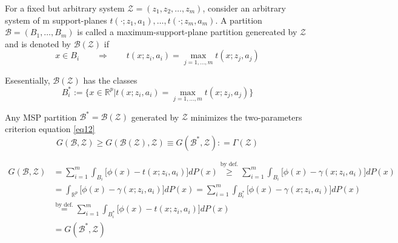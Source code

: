\documentclass{article}
\begin{document}
\begin{tcolorbox}[coltitle= black!80, colframe=green!35, colback=green!10 ,title=\textbf{Definition: Maximum Support Plane (MSP)}]
For a fixed but arbitrary system $\mathcal Z = (z_1, z_2, \ldots,z_m)$, consider an arbitrary system of m support-planes $t(\cdot; z_1,a_1),\ldots, t(\cdot; z_m,a_m)$. A partition $\mathcal B = (B_1, \ldots, B_m)$ is called a maximum-support-plane partition genereated by $\mathcal Z$ and is denoted by $\mathcal B(\mathcal Z)$ if
\vspace{-4mm}
\begin{equation}
	x \in B_i \quad\quad  \Rightarrow  \quad\quad t(x;z_i,a_i) = \max_{j = 1,\ldots,m} t(x; z_j,a_j)
\end{equation}

Esesentially, $\mathcal B(\mathcal Z)$ has the classes
\vspace{-2mm}
\begin{equation}
	B_i^* := \big\{ x\in \mathbb R^p \big| t(x; z_i, a_i) = \max_{j = 1,\ldots,m} t(x; z_j,a_j) \big\}
\end{equation}

\end{tcolorbox}

\begin{tcolorbox}[coltitle= black!80, colframe=red!35, colback=red!10 ,title=\textbf{Theorem:  B(Z) Maximize G(B, Z) Comparing to All Possible Partition B }]
 Any MSP partition $\mathcal B^* = \mathcal B(\mathcal Z)$ generated by $\mathcal Z$ minimizes the two-parameters criterion equation \ref{eq12}
 \vspace{-2mm}
 \begin{equation}
 	G(\mathcal B, \mathcal Z) \ge G(\mathcal B(\mathcal Z), \mathcal Z) \equiv G(\mathcal B^*, \mathcal Z) : = \Gamma(\mathcal Z)
 \end{equation}
 
\end{tcolorbox}


\begin{tcolorbox}[coltitle= black!80, colframe=blue!35, colback=blue!10 ,title=\textbf{Proof of Theorem}]

\begin{align}
	G(\mathcal B,\mathcal Z) &= \sum_{i=1}^m \int_{B_i} \big[ \phi(x) - t(x; z_i, a_i) \big]dP(x) \overset{\text{by def.}}{\ge}  \sum_{i=1}^m \int_{B_i} \big[ \phi(x) - \gamma(x; z_i, a_i) \big]dP(x)\\
	& = \int_{\mathbb R^p} \big[ \phi(x) - \gamma(x; z_i, a_i) \big]dP(x) = \sum_{i=1}^m \int_{B_i^*} \big[ \phi(x) - \gamma(x; z_i, a_i) \big]dP(x)\\
	& \overset{\text{by def.}}{=} \sum_{i=1}^m \int_{B_i^*} \big[ \phi(x) - t(x; z_i, a_i) \big]dP(x)\\
	& = G(\mathcal B^*, \mathcal Z)
\end{align}

\end{tcolorbox}
\end{document}
